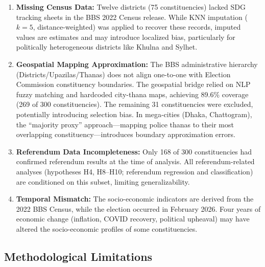 \documentclass[12pt, a4paper]{article}
\begin{document}
\begin{enumerate}
    \item \textbf{Missing Census Data:} Twelve districts (75 constituencies) lacked SDG tracking sheets in the BBS 2022 Census release. While KNN imputation ($k = 5$, distance-weighted) was applied to recover these records, imputed values are estimates and may introduce localized bias, particularly for politically heterogeneous districts like Khulna and Sylhet.

    \item \textbf{Geospatial Mapping Approximation:} The BBS administrative hierarchy (Districts/Upazilas/Thanas) does not align one-to-one with Election Commission constituency boundaries. The geospatial bridge relied on NLP fuzzy matching and hardcoded city-thana maps, achieving 89.6\% coverage (269 of 300 constituencies). The remaining 31 constituencies were excluded, potentially introducing selection bias. In mega-cities (Dhaka, Chattogram), the ``majority proxy'' approach---mapping police thanas to their most overlapping constituency---introduces boundary approximation errors.

    \item \textbf{Referendum Data Incompleteness:} Only 168 of 300 constituencies had confirmed referendum results at the time of analysis. All referendum-related analyses (hypotheses H4, H8--H10; referendum regression and classification) are conditioned on this subset, limiting generalizability.

    \item \textbf{Temporal Mismatch:} The socio-economic indicators are derived from the 2022 BBS Census, while the election occurred in February 2026. Four years of economic change (inflation, COVID recovery, political upheaval) may have altered the socio-economic profiles of some constituencies.
\end{enumerate}

\subsection{Methodological Limitations}
\end{document}
